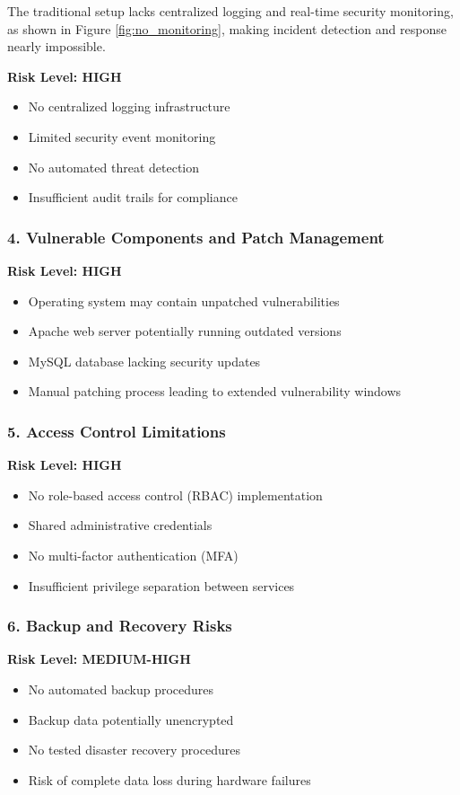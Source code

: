 \documentclass[12pt]{article}
\begin{document}
The traditional setup lacks centralized logging and real-time security monitoring, as shown in Figure \ref{fig:no_monitoring}, making incident detection and response nearly impossible.

\textbf{Risk Level: HIGH}
\begin{itemize}
\item No centralized logging infrastructure
\item Limited security event monitoring
\item No automated threat detection
\item Insufficient audit trails for compliance
\end{itemize}

\subsubsection{4. Vulnerable Components and Patch Management}

\textbf{Risk Level: HIGH}
\begin{itemize}
\item Operating system may contain unpatched vulnerabilities
\item Apache web server potentially running outdated versions
\item MySQL database lacking security updates
\item Manual patching process leading to extended vulnerability windows
\end{itemize}

\subsubsection{5. Access Control Limitations}

\textbf{Risk Level: HIGH}
\begin{itemize}
\item No role-based access control (RBAC) implementation
\item Shared administrative credentials
\item No multi-factor authentication (MFA)
\item Insufficient privilege separation between services
\end{itemize}

\subsubsection{6. Backup and Recovery Risks}

\textbf{Risk Level: MEDIUM-HIGH}
\begin{itemize}
\item No automated backup procedures
\item Backup data potentially unencrypted
\item No tested disaster recovery procedures
\item Risk of complete data loss during hardware failures
\end{itemize}
\end{document}

